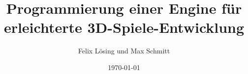 \title{Programmierung einer Engine für erleichterte 3D-Spiele-Entwicklung}
\date{\today}
\author{Felix Lösing und Max Schmitt}

\maketitle